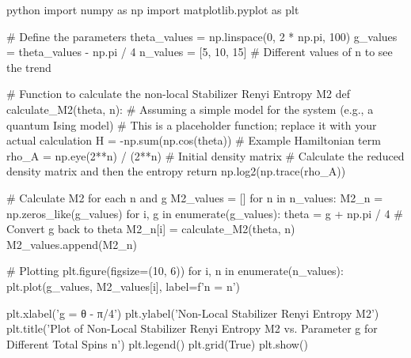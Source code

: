 python
import numpy as np
import matplotlib.pyplot as plt

# Define the parameters
theta_values = np.linspace(0, 2 * np.pi, 100)
g_values = theta_values - np.pi / 4
n_values = [5, 10, 15]  # Different values of n to see the trend

# Function to calculate the non-local Stabilizer Renyi Entropy M2
def calculate_M2(theta, n):
    # Assuming a simple model for the system (e.g., a quantum Ising model)
    # This is a placeholder function; replace it with your actual calculation
    H = -np.sum(np.cos(theta))  # Example Hamiltonian term
    rho_A = np.eye(2**n) / (2**n)  # Initial density matrix
    # Calculate the reduced density matrix and then the entropy
    return np.log2(np.trace(rho_A))

# Calculate M2 for each n and g
M2_values = []
for n in n_values:
    M2_n = np.zeros_like(g_values)
    for i, g in enumerate(g_values):
        theta = g + np.pi / 4  # Convert g back to theta
        M2_n[i] = calculate_M2(theta, n)
    M2_values.append(M2_n)

# Plotting
plt.figure(figsize=(10, 6))
for i, n in enumerate(n_values):
    plt.plot(g_values, M2_values[i], label=f'n = {n}')

plt.xlabel('g = θ - π/4')
plt.ylabel('Non-Local Stabilizer Renyi Entropy M2')
plt.title('Plot of Non-Local Stabilizer Renyi Entropy M2 vs. Parameter g for Different Total Spins n')
plt.legend()
plt.grid(True)
plt.show()